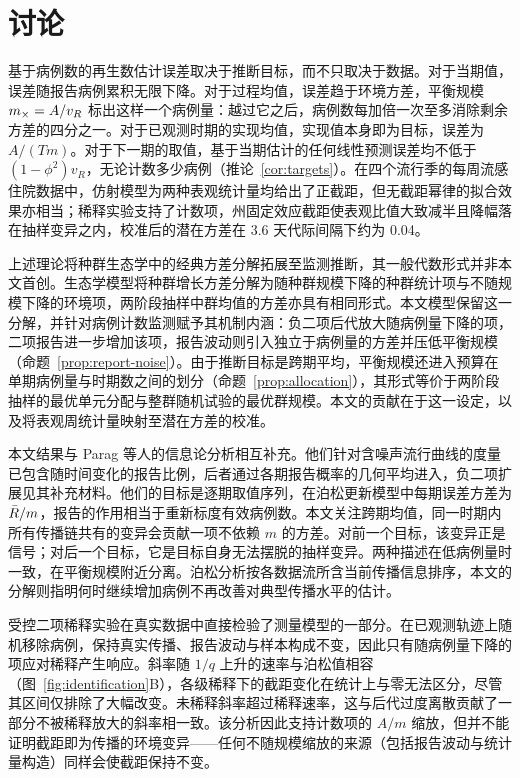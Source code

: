 \section{讨论}
\label{sec:discussion}

基于病例数的再生数估计误差取决于推断目标，而不只取决于数据。对于当期值，误差随报告病例累积无限下降。对于过程均值，误差趋于环境方差，平衡规模 $m_{\times}=A/v_R$ 标出这样一个病例量：越过它之后，病例数每加倍一次至多消除剩余方差的四分之一。对于已观测时期的实现均值，实现值本身即为目标，误差为 $A/(Tm)$。对于下一期的取值，基于当期估计的任何线性预测误差均不低于 $(1-\phi^2)v_R$，无论计数多少病例（推论~\ref{cor:targets}）。在四个流行季的每周流感住院数据中，仿射模型为两种表观统计量均给出了正截距，但无截距幂律的拟合效果亦相当；稀释实验支持了计数项，州固定效应截距使表观比值大致减半且降幅落在抽样变异之内，校准后的潜在方差在 3.6 天代际间隔下约为 0.04。

上述理论将种群生态学中的经典方差分解拓展至监测推断，其一般代数形式并非本文首创。生态学模型将种群增长方差分解为随种群规模下降的种群统计项与不随规模下降的环境项\citep{engen1998demographic, lande2003stochastic}，两阶段抽样中群均值的方差亦具有相同形式\citep{cochran1977sampling}。本文模型保留这一分解，并针对病例计数监测赋予其机制内涵：负二项后代放大随病例量下降的项\citep{lloydsmith2005superspreading}，二项报告进一步增加该项，报告波动则引入独立于病例量的方差并压低平衡规模（命题~\ref{prop:report-noise}）。由于推断目标是跨期平均，平衡规模还进入预算在单期病例量与时期数之间的划分（命题~\ref{prop:allocation}），其形式等价于两阶段抽样的最优单元分配与整群随机试验的最优群规模\citep{raudenbush1997statistical}。本文的贡献在于这一设定，以及将表观周统计量映射至潜在方差的校准。

本文结果与 Parag 等人的信息论分析相互补充\citep{parag2021improved, parag2022quantifying}。他们针对含噪声流行曲线的度量已包含随时间变化的报告比例，后者通过各期报告概率的几何平均进入，负二项扩展见其补充材料\citep{parag2022quantifying}。他们的目标是逐期取值序列，在泊松更新模型中每期误差方差为 $\bar{R}/m$，报告的作用相当于重新标度有效病例数。本文关注跨期均值，同一时期内所有传播链共有的变异会贡献一项不依赖 $m$ 的方差。对前一个目标，该变异正是信号；对后一个目标，它是目标自身无法摆脱的抽样变异。两种描述在低病例量时一致，在平衡规模附近分离。泊松分析按各数据流所含当前传播信息排序，本文的分解则指明何时继续增加病例不再改善对典型传播水平的估计。

受控二项稀释实验在真实数据中直接检验了测量模型的一部分。在已观测轨迹上随机移除病例，保持真实传播、报告波动与样本构成不变，因此只有随病例量下降的项应对稀释产生响应。斜率随 $1/q$ 上升的速率与泊松值相容（图~\ref{fig:identification}B），各级稀释下的截距变化在统计上与零无法区分，尽管其区间仅排除了大幅改变。未稀释斜率超过稀释速率，这与后代过度离散贡献了一部分不被稀释放大的斜率相一致。该分析因此支持计数项的 $A/m$ 缩放，但并不能证明截距即为传播的环境变异——任何不随规模缩放的来源（包括报告波动与统计量构造）同样会使截距保持不变。

